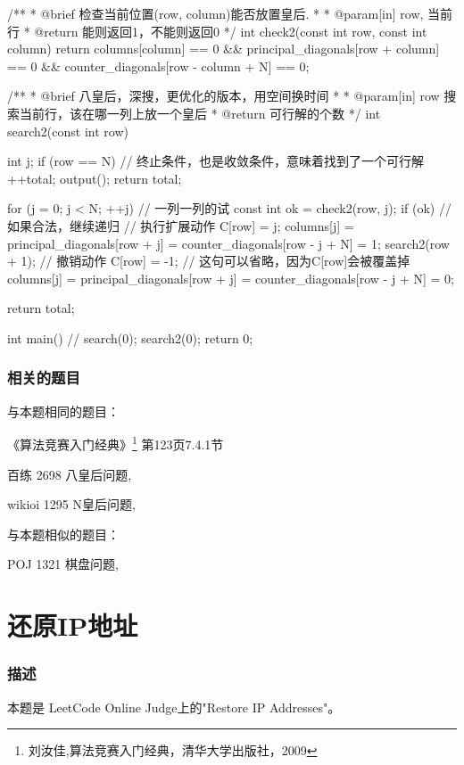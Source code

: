 \begin{Codex}[label=eight_queen.c]
/**
 * @brief 检查当前位置(row, column)能否放置皇后.
 *
 * @param[in] row, 当前行
 * @return 能则返回1，不能则返回0
 */
int check2(const int row, const int column) {
    return columns[column] == 0 && principal_diagonals[row + column] == 0
        && counter_diagonals[row - column + N] == 0;
}

/**
 * @brief 八皇后，深搜，更优化的版本，用空间换时间
 *
 * @param[in] row 搜索当前行，该在哪一列上放一个皇后
 * @return 可行解的个数
 */
int search2(const int row) {
    int j;
    if (row == N) { // 终止条件，也是收敛条件，意味着找到了一个可行解
        ++total;
        output();
        return total;
    }

    for (j = 0; j < N; ++j) {  // 一列一列的试
        const int ok = check2(row, j);
        if (ok) {  // 如果合法，继续递归
            // 执行扩展动作
            C[row] = j;
            columns[j] = principal_diagonals[row + j] =
                    counter_diagonals[row - j + N] = 1;
            search2(row + 1);
            // 撤销动作
            C[row] = -1;  // 这句可以省略，因为C[row]会被覆盖掉
            columns[j] = principal_diagonals[row + j] =
                    counter_diagonals[row - j + N] = 0;
        }
    }

    return total;
}

int main() {
    // search(0);
    search2(0);
    return 0;
}
\end{Codex}

\subsubsection{相关的题目}
与本题相同的题目：
\begindot
\item 《算法竞赛入门经典》\footnote{刘汝佳,算法竞赛入门经典，清华大学出版社，2009} 第123页7.4.1节
\item 百练 2698 八皇后问题, 
\item wikioi 1295 N皇后问题, 
\myenddot

与本题相似的题目：
\begindot
\item POJ 1321 棋盘问题, 
\myenddot


\section{还原IP地址} %

\subsubsection{描述}
本题是 LeetCode Online Judge上的"Restore IP Addresses"。

